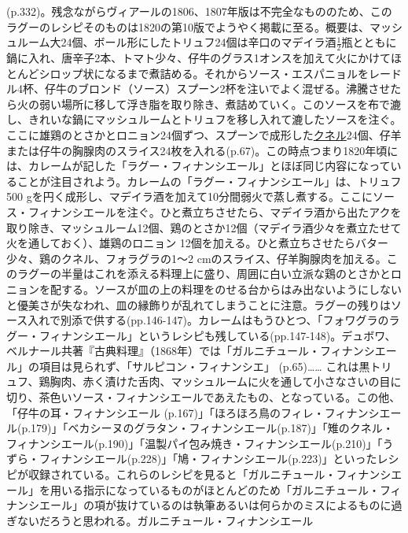 \begin{recette}
{{{{  (p.332)。残念ながらヴィアールの1806、1807年版は不完全なもののため、このラグーのレシピそのものは1820の第10版でようやく掲載に至る。概要は、マッシュルーム大24個、ボール形にしたトリュフ24個は辛口のマデイラ酒\(\frac{1}{2}\)瓶とともに鍋に入れ、唐辛子2本、トマト少々、仔牛のグラス1オンスを加えて火にかけてほとんどシロップ状になるまで煮詰める。それからソース・エスパニョルをレードル4杯、仔牛のブロンド（ソース）スプーン2杯を注いでよく混ぜる。沸騰させたら火の弱い場所に移して浮き脂を取り除き、煮詰めていく。このソースを布で漉し、きれいな鍋にマッシュルームとトリュフを移し入れて漉したソースを注ぐ。ここに雄鶏のとさかとロニョン24個ずつ、スプーンで成形した\protect\hyperlink{quenelles}{クネル}24個、仔羊または仔牛の胸腺肉のスライス24枚を入れる(p.67)。この時点つまり1820年頃には、カレームが記した「ラグー・フィナンシエール」とほぼ同じ内容になっていることが注目されよう。カレームの「ラグー・フィナンシエール」は、トリュフ500
  gを円く成形し、マデイラ酒を加えて10分間弱火で蒸し煮する。ここにソース・フィナンシエールを注ぐ。ひと煮立ちさせたら、マデイラ酒から出たアクを取り除き、マッシュルーム12個、鶏のとさか12個（マデイラ酒少々を煮立たせて火を通しておく）、雄鶏のロニョン
  12個を加える。ひと煮立ちさせたらバター少々、鶏のクネル、フォラグラの1〜2
  cmのスライス、仔羊胸腺肉を加える。このラグーの半量はこれを添える料理上に盛り、周囲に白い立派な鶏のとさかとロニョンを配する。ソースが皿の上の料理をのせる台からはみ出ないようにしないと優美さが失なわれ、皿の縁飾りが乱れてしまうことに注意。ラグーの残りはソース入れで別添で供する(pp.146-147)。カレームはもうひとつ、「フォワグラのラグー・フィナンシエール」というレシピも残している(pp.147-148)。デュボワ、ベルナール共著『古典料理』（1868年）では「ガルニチュール・フィナンシエール」の項目は見られず、「サルピコン・フィナンシエ」
  (p.65)\ldots{}\ldots{}
  これは黒トリュフ、鶏胸肉、赤く漬けた舌肉、マッシュルームに火を通して小さなさいの目に切り、茶色いソース・フィナンシエールであえたもの、となっている。この他、「仔牛の耳・フィナンシエール
  (p.167)」「ほろほろ鳥のフィレ・フィナンシエール(p.179)」「ベカシーヌのグラタン・フィナンシエール(p.187)」「雉のクネル・フィナンシエール(p.190)」「温製パイ包み焼き・フィナンシエール(p.210)」「うずら・フィナンシエール(p.228)」「鳩・フィナンシエール(p.223)」といったレシピが収録されている。これらのレシピを見ると「ガルニチュール・フィナンシエール」を用いる指示になっているものがほとんどのため「ガルニチュール・フィナンシエール」の項が抜けているのは執筆あるいは何らかのミスによるものに過ぎないだろうと思われる。}}{ガルニチュール・フィナンシエール}}\label{garniture-a-la-financiere}}



\end{recette}
